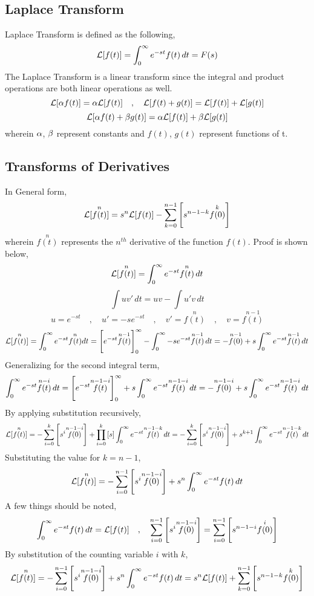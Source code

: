 \documentclass[class=report, 12pt, crop=false]{standalone}
\begin{document}
\begin{center}
\chapter{Laplace Transform}
\begin{comment}
Laplace Transform Header
\end{comment}
\begin{comment}
\end{comment}
Laplace Transform is defined as the following,
$$\mathcal{L}[f(t)] = \int^{\infty}_{0}e^{-st}f(t)\,dt = F(s)$$
The Laplace Transform is a linear transform since the integral and product operations are both linear operations as well.
$$\mathcal{L}[\alpha f(t)] = \alpha\mathcal{L}[f(t)]\quad,\quad\mathcal{L}[f(t) + g(t)] = \mathcal{L}[f(t)] + \mathcal{L}[g(t)]$$
$$\mathcal{L}[\alpha f(t) + \beta g(t)] = \alpha\mathcal{L}[f(t)] + \beta\mathcal{L}[g(t)]$$
wherein $\alpha$, $\beta$ represent constants and $f(t)$, $g(t)$ represent functions of t.
\section{Transforms of Derivatives}
\begin{comment}
\end{comment}
In General form,
$$\mathcal{L}[\overset{n}{f(t)}] = s^n\mathcal{L}[f(t)] - \sum^{n - 1}_{k = 0}\left[s^{n - 1 - k}\overset{k}{f(0)}\right]$$
wherein $\overset{n}{f(t)}$ represents the $n^{th}$ derivative of the function $f(t)$. Proof is shown below,
$$\mathcal{L}[\overset{n}{f(t)}] = \int^{\infty}_{0}e^{-st}\overset{n}{f(t)}\,dt$$
$$\int uv' \,dt = uv - \int u'v \,dt$$
$$u = e^{-st}\quad,\quad u' = -se^{-st} \quad,\quad v' = \overset{n}{f(t)} \quad,\quad v = \overset{n-1}{f(t)}$$
$$\mathcal{L}[\overset{n}{f(t)}] = \int^{\infty}_{0}e^{-st}\overset{n}{f(t)}dt = \left[e^{-st}\overset{n-1}{f(t)}\right]^{\infty}_{0} - \int^{\infty}_{0}-se^{-st}\overset{n-1}{f(t)} \,dt = -\overset{n-1}{f(0)} + s\int^{\infty}_{0}e^{-st}\overset{n-1}{f(t)} \,dt $$
Generalizing for the second integral term,
$$\int^{\infty}_{0}e^{-st}\overset{n-i}{f(t)} \,dt = \left[e^{-st}\overset{n-1-i}{f(t)}\right]^{\infty}_{0} + s\int^{\infty}_{0}e^{-st}\overset{n-1-i}{f(t)} \,dt = -\overset{n-1-i}{f(0)} + s\int^{\infty}_{0}e^{-st}\overset{n-1-i}{f(t)} \,dt$$
By applying substitution recursively,
$$\mathcal{L}[\overset{n}{f(t)}] = -\sum^{k}_{i = 0}\left[s^i\overset{n-1-i}{f(0)}\right] + \prod^{k}_{i = 0}\left[s\right]\int^{\infty}_{0}e^{-st}\overset{n-1-k}{f(t)} \,dt = -\sum^{k}_{i = 0}\left[s^i\overset{n-1-i}{f(0)}\right] + s^{k + 1}\int^{\infty}_{0}e^{-st}\overset{n-1-k}{f(t)} \,dt$$
Substituting the value for $k = n-1$,
$$\mathcal{L}[\overset{n}{f(t)}] = -\sum^{n-1}_{i = 0}\left[s^i\overset{n-1-i}{f(0)}\right] + s^{n}\int^{\infty}_{0}e^{-st}f(t) \,dt$$
A few things should be noted,
$$\int^{\infty}_{0}e^{-st}f(t) \,dt = \mathcal{L}[f(t)]\quad,\quad \sum^{n-1}_{i = 0}\left[s^i\overset{n-1-i}{f(0)}\right] = \sum^{n-1}_{i = 0}\left[s^{n-1-i}\overset{i}{f(0)}\right]$$
By substitution of the counting variable $i$ with $k$,
$$\mathcal{L}[\overset{n}{f(t)}] = -\sum^{n-1}_{i = 0}\left[s^i\overset{n-1-i}{f(0)}\right] + s^{n}\int^{\infty}_{0}e^{-st}f(t) \,dt = s^n \mathcal{L}[f(t)] + \sum^{n-1}_{k = 0}\left[s^{n-1-k}\overset{k}{f(0)}\right]$$

\end{center}
\end{document}
